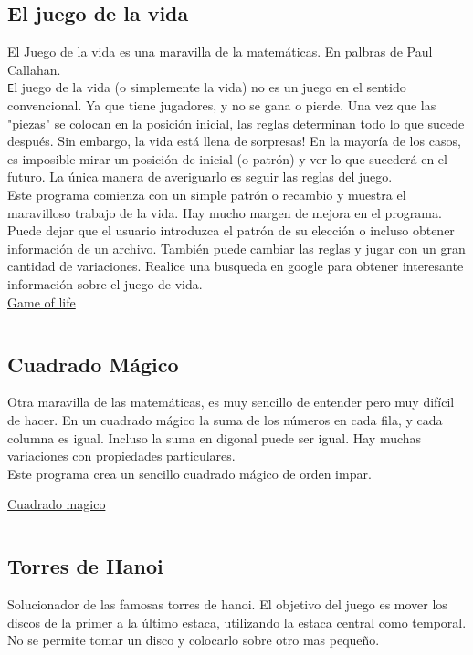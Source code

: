\documentclass{article}
\begin{document}
\subsection{El juego de la vida}%
El Juego de la vida es una maravilla de la matemáticas. En palbras de Paul
Callahan.\\

{\texttt El juego de la vida (o simplemente la vida) no es un juego en el sentido
convencional. Ya que tiene jugadores, y no se gana o pierde. Una vez que las
"piezas" se colocan en la posición inicial, las reglas determinan todo lo que
sucede después.  Sin embargo, la vida está llena de sorpresas! En la mayoría de
los casos, es imposible mirar un posición de inicial (o patrón) y ver lo que
sucederá en el futuro. La única manera de averiguarlo es seguir las reglas del
juego.}\\

Este programa comienza con un simple patrón o recambio y muestra el maravilloso
trabajo de la vida. Hay mucho margen de mejora en el programa. Puede dejar que
el usuario introduzca el patrón de su elección o incluso obtener información de
un archivo. También puede cambiar las reglas y jugar con un gran cantidad de
variaciones. Realice una busqueda en google para obtener interesante
información sobre el juego de vida.\\

\href{https://github.com/nasciiboy/NCURSES-Programming-HOWTO/blob/master/ncurses_programs/JustForFun/life.c}{Game of life}
\inputminted{cpp}{./cpp/life.cpp}

\subsection{Cuadrado Mágico}%
Otra maravilla de las matemáticas, es muy sencillo de entender pero muy difícil
de hacer. En un cuadrado mágico la suma de los números en cada fila, y cada
columna es igual. Incluso la suma en digonal puede ser igual. Hay muchas
variaciones con propiedades particulares.\\

Este programa crea un sencillo cuadrado mágico de orden impar.

\href{https://github.com/nasciiboy/NCURSES-Programming-HOWTO/blob/master/ncurses_programs/JustForFun/magic.c}{Cuadrado magico}
\inputminted{cpp}{./cpp/magic.cpp}

\subsection{Torres de Hanoi}%
Solucionador de las famosas torres de hanoi. El objetivo del juego es mover los
discos de la primer a la último estaca, utilizando la estaca central como
temporal. No se permite tomar un disco y colocarlo sobre otro mas pequeño.\\
\end{document}
